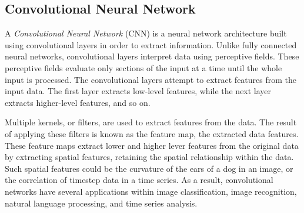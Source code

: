 \subsection{Convolutional Neural Network}
A \textit{Convolutional Neural Network} (CNN) is a neural network architecture built using convolutional layers in order to extract information.
Unlike fully connected neural networks, convolutional layers interpret data using perceptive fields.
These perceptive fields evaluate only sections of the input at a time until the whole input is processed.
The convolutional layers attempt to extract features from the input data.
The first layer extracts low-level features, while the next layer extracts higher-level features, and so on.

\cite[p.~443-446]{Geron2017}


Multiple kernels, or filters, are used to extract features from the data.
The result of applying these filters is known as the feature map, the extracted data features.
These feature maps extract lower and higher lever features from the original data by
extracting spatial features, retaining the spatial relationship within the data.
Such spatial features could be the curvature of the ears of a dog in an image, or the correlation of timestep data in a time series.
As a result, convolutional networks have several applications within image classification,
image recognition, natural language processing, and time series analysis.



\iffalse
The use of this feature map means that CNNs are good with data that has a spatial
relationship. For example, there is a relationship of order between the words in a sentence.
And there is an ordered relationship in the time steps of a time series.
\fi

